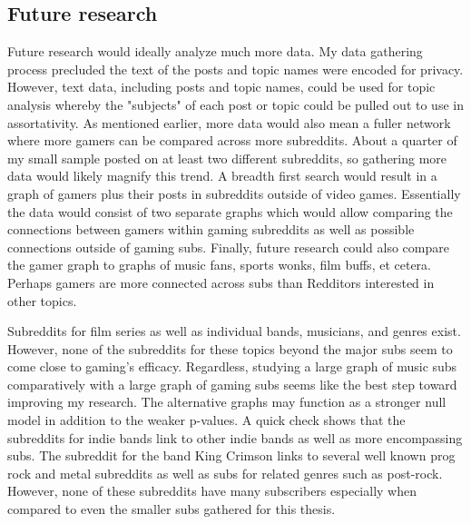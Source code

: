 \documentclass[12pt, a4paper]{article}
\begin{document}
\subsection{Future research}
Future research would ideally analyze much more data. My data gathering process precluded the text of the posts and topic names were encoded for privacy. However, text data, including posts and topic names, could be used for topic analysis whereby the "subjects" of each post or topic could be pulled out to use in assortativity. As mentioned earlier, more data would also mean a fuller network where more gamers can be compared across more subreddits. About a quarter of my small sample posted on at least two different subreddits, so gathering more data would likely magnify this trend. A breadth first search would result in a graph of gamers plus their posts in subreddits outside of video games. Essentially the data would consist of two separate graphs which would allow comparing the connections between gamers within gaming subreddits as well as possible connections outside of gaming subs. Finally, future research could also compare the gamer graph to graphs of music fans, sports wonks, film buffs, et cetera. Perhaps gamers are more connected across subs than Redditors interested in other topics.

Subreddits for film series as well as individual bands, musicians, and genres exist. However, none of the subreddits for these topics beyond the major subs seem to come close to gaming's efficacy. Regardless, studying a large graph of music subs comparatively with a large graph of gaming subs seems like the best step toward improving my research. The alternative graphs may function as a stronger null model in addition to the weaker p-values. A quick check shows that the subreddits for indie bands link to other indie bands as well as more encompassing subs. The subreddit for the band King Crimson links to several well known prog rock and metal subreddits as well as subs for related genres such as post-rock. However, none of these subreddits have many subscribers especially when compared to even the smaller subs gathered for this thesis.

\printbibliography
\end{document}
